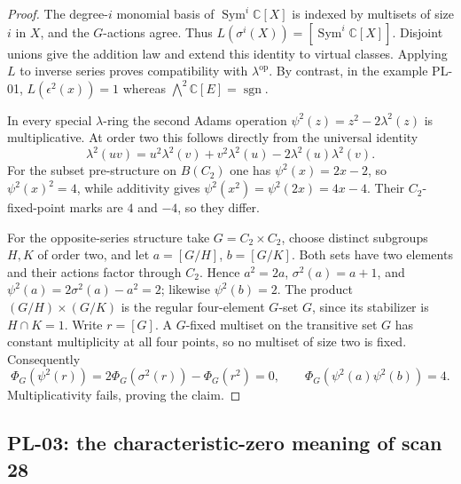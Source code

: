 \documentclass[11pt,a4paper]{article}
\begin{document}
\begin{proof}
The degree-$i$ monomial basis of $\operatorname{Sym}^i\mathbb C[X]$ is indexed
by multisets of size $i$ in $X$, and the $G$-actions agree. Thus
$L(\sigma^i(X))=[\operatorname{Sym}^i\mathbb C[X]]$.
Disjoint unions give the addition law and extend this identity to virtual
classes. Applying $L$ to inverse series proves compatibility with
$\lambda^{\mathrm{op}}$. By contrast, in the example PL-01,
$L(\epsilon^2(x))=1$ whereas $\bigwedge^2\mathbb C[E]=\operatorname{sgn}$.

In every special $\lambda$-ring the second Adams operation
$\psi^2(z)=z^2-2\lambda^2(z)$ is multiplicative. At order two this follows
directly from the universal identity
\[
 \lambda^2(uv)=u^2\lambda^2(v)+v^2\lambda^2(u)
                       -2\lambda^2(u)\lambda^2(v).
\]
For the subset pre-structure on $B(C_2)$ one has
$\psi^2(x)=2x-2$, so
$\psi^2(x)^2=4$, while additivity gives
$\psi^2(x^2)=\psi^2(2x)=4x-4$. Their $C_2$-fixed-point marks are
$4$ and $-4$, so they differ.

For the opposite-series structure take $G=C_2\times C_2$, choose distinct
subgroups $H,K$ of order two, and let $a=[G/H]$, $b=[G/K]$.
Both sets have two elements and their actions factor through $C_2$. Hence
$a^2=2a$, $\sigma^2(a)=a+1$, and
$\psi^2(a)=2\sigma^2(a)-a^2=2$; likewise $\psi^2(b)=2$.
The product $(G/H)\times(G/K)$ is the regular four-element $G$-set $G$,
since its stabilizer is $H\cap K=1$. Write $r=[G]$. A $G$-fixed multiset on
the transitive set $G$ has constant multiplicity at all four points, so no
multiset of size two is fixed. Consequently
\[
 \Phi_G(\psi^2(r))=
  2\Phi_G(\sigma^2(r))-\Phi_G(r^2)=0,
 \qquad
 \Phi_G(\psi^2(a)\psi^2(b))=4.
\]
Multiplicativity fails, proving the claim.
\end{proof}

\subsection{PL-03: the characteristic-zero meaning of scan 28}
\end{document}
